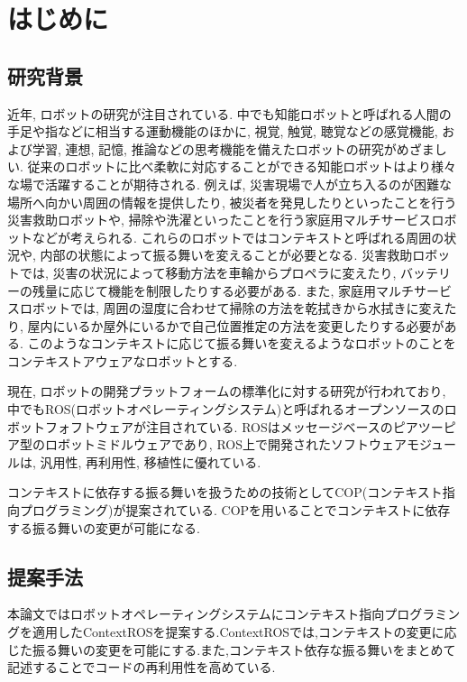 
\chapter{はじめに}
\label{cha:intro}

\section{研究背景}
近年, ロボットの研究が注目されている. 中でも知能ロボットと呼ばれる人間の手足や指などに相当する運動機能のほかに, 視覚, 触覚, 聴覚などの感覚機能, および学習, 連想, 記憶, 推論などの思考機能を備えたロボットの研究がめざましい. 従来のロボットに比べ柔軟に対応することができる知能ロボットはより様々な場で活躍することが期待される. 例えば, 災害現場で人が立ち入るのが困難な場所へ向かい周囲の情報を提供したり, 被災者を発見したりといったことを行う災害救助ロボットや, 掃除や洗濯といったことを行う家庭用マルチサービスロボットなどが考えられる. これらのロボットではコンテキストと呼ばれる周囲の状況や, 内部の状態によって振る舞いを変えることが必要となる. 災害救助ロボットでは, 災害の状況によって移動方法を車輪からプロペラに変えたり, バッテリーの残量に応じて機能を制限したりする必要がある. また, 家庭用マルチサービスロボットでは, 周囲の湿度に合わせて掃除の方法を乾拭きから水拭きに変えたり, 屋内にいるか屋外にいるかで自己位置推定の方法を変更したりする必要がある. このようなコンテキストに応じて振る舞いを変えるようなロボットのことをコンテキストアウェアなロボットとする.\par
現在, ロボットの開発プラットフォームの標準化に対する研究が行われており, 中でもROS(ロボットオペレーティングシステム)と呼ばれるオープンソースのロボットフォフトウェアが注目されている. ROSはメッセージベースのピアツーピア型のロボットミドルウェアであり, ROS上で開発されたソフトウェアモジュールは, 汎用性, 再利用性, 移植性に優れている.\par
コンテキストに依存する振る舞いを扱うための技術としてCOP(コンテキスト指向プログラミング)が提案されている. COPを用いることでコンテキストに依存する振る舞いの変更が可能になる.

\section{提案手法}
本論文ではロボットオペレーティングシステムにコンテキスト指向プログラミングを適用したContextROSを提案する.ContextROSでは,コンテキストの変更に応じた振る舞いの変更を可能にする.また,コンテキスト依存な振る舞いをまとめて記述することでコードの再利用性を高めている.



